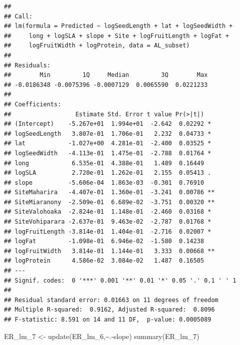 \documentclass[
  12pt,
]{article}
\newenvironment{Shaded}{\begin{snugshade}}{\end{snugshade}}
\newcommand{\FunctionTok}[1]{\textcolor[rgb]{0.00,0.00,0.00}{#1}}
\newcommand{\NormalTok}[1]{#1}
\newcommand{\OtherTok}[1]{\textcolor[rgb]{0.56,0.35,0.01}{#1}}
\newcommand{\SpecialCharTok}[1]{\textcolor[rgb]{0.00,0.00,0.00}{#1}}
\begin{document}
\begin{verbatim}
## 
## Call:
## lm(formula = Predicted ~ logSeedLength + lat + logSeedWidth + 
##     long + logSLA + slope + Site + logFruitLength + logFat + 
##     logFruitWidth + logProtein, data = AL_subset)
## 
## Residuals:
##        Min         1Q     Median         3Q        Max 
## -0.0186348 -0.0075396 -0.0007129  0.0065590  0.0221233 
## 
## Coefficients:
##                  Estimate Std. Error t value Pr(>|t|)   
## (Intercept)    -5.267e+01  1.994e+01  -2.642  0.02292 * 
## logSeedLength   3.807e-01  1.706e-01   2.232  0.04733 * 
## lat            -1.027e+00  4.281e-01  -2.400  0.03525 * 
## logSeedWidth   -4.113e-01  1.475e-01  -2.788  0.01764 * 
## long            6.535e-01  4.388e-01   1.489  0.16449   
## logSLA          2.720e-01  1.262e-01   2.155  0.05413 . 
## slope          -5.606e-04  1.863e-03  -0.301  0.76910   
## SiteMaharira   -4.407e-01  1.360e-01  -3.241  0.00786 **
## SiteMiaranony  -2.509e-01  6.689e-02  -3.751  0.00320 **
## SiteValohoaka  -2.824e-01  1.148e-01  -2.460  0.03168 * 
## SiteVohiparara -2.637e-01  9.463e-02  -2.787  0.01768 * 
## logFruitLength -3.814e-01  1.404e-01  -2.716  0.02007 * 
## logFat         -1.098e-01  6.946e-02  -1.580  0.14238   
## logFruitWidth   3.814e-01  1.144e-01   3.333  0.00668 **
## logProtein      4.586e-02  3.084e-02   1.487  0.16505   
## ---
## Signif. codes:  0 '***' 0.001 '**' 0.01 '*' 0.05 '.' 0.1 ' ' 1
## 
## Residual standard error: 0.01663 on 11 degrees of freedom
## Multiple R-squared:  0.9162, Adjusted R-squared:  0.8096 
## F-statistic: 8.591 on 14 and 11 DF,  p-value: 0.0005089
\end{verbatim}

\begin{Shaded}
\begin{Highlighting}[]
\NormalTok{ER\_lm\_7 }\OtherTok{\textless{}{-}} \FunctionTok{update}\NormalTok{(ER\_lm\_6,}\SpecialCharTok{\textasciitilde{}}\NormalTok{.}\SpecialCharTok{{-}}\NormalTok{slope)}
\FunctionTok{summary}\NormalTok{(ER\_lm\_7)}
\end{Highlighting}
\end{Shaded}
\end{document}
